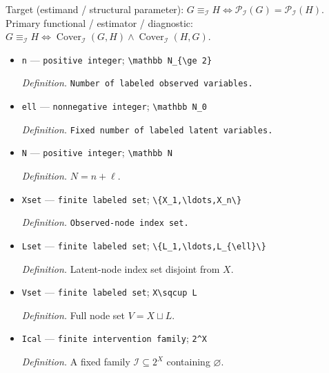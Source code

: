 \documentclass{article}
\begin{document}
Target (estimand / structural parameter): \(G\equiv_{\mathcal I}H\Longleftrightarrow\mathcal P_{\mathcal I}(G)=\mathcal P_{\mathcal I}(H)\).
Primary functional / estimator / diagnostic: \(G\equiv_{\mathcal I}H\Longleftrightarrow\operatorname{Cover}_{\mathcal I}(G,H)\wedge\operatorname{Cover}_{\mathcal I}(H,G)\).
\begin{itemize}
  \item \texttt{n} --- \texttt{positive integer}; \texttt{\textbackslash{}\allowbreak{}mathbb N\_\allowbreak{}\{\textbackslash{}\allowbreak{}ge 2\}\allowbreak{}}
  \par\smallskip\noindent\emph{Definition.} \texttt{Number of labeled observed variables.}
  \item \texttt{ell} --- \texttt{nonnegative integer}; \texttt{\textbackslash{}\allowbreak{}mathbb N\_\allowbreak{}0}
  \par\smallskip\noindent\emph{Definition.} \texttt{Fixed number of labeled latent variables.}
  \item \texttt{N} --- \texttt{positive integer}; \texttt{\textbackslash{}\allowbreak{}mathbb N}
  \par\smallskip\noindent\emph{Definition.} \(N=n+\ell\).
  \item \texttt{Xset} --- \texttt{finite labeled set}; \texttt{\textbackslash{}\allowbreak{}\{X\_\allowbreak{}1,\allowbreak{}\textbackslash{}\allowbreak{}ldots,\allowbreak{}X\_\allowbreak{}n\textbackslash{}\allowbreak{}\}\allowbreak{}}
  \par\smallskip\noindent\emph{Definition.} \texttt{Observed-\allowbreak{}node index set.}
  \item \texttt{Lset} --- \texttt{finite labeled set}; \texttt{\textbackslash{}\allowbreak{}\{L\_\allowbreak{}1,\allowbreak{}\textbackslash{}\allowbreak{}ldots,\allowbreak{}L\_\allowbreak{}\{\textbackslash{}\allowbreak{}ell\}\allowbreak{}\textbackslash{}\allowbreak{}\}\allowbreak{}}
  \par\smallskip\noindent\emph{Definition.} Latent-node index set disjoint from \(X\).
  \item \texttt{Vset} --- \texttt{finite labeled set}; \texttt{X\textbackslash{}\allowbreak{}sqcup L}
  \par\smallskip\noindent\emph{Definition.} Full node set \(V=X\sqcup L\).
  \item \texttt{Ical} --- \texttt{finite intervention family}; \texttt{2\textasciicircum{}X}
  \par\smallskip\noindent\emph{Definition.} A fixed family \(\mathcal I\subseteq 2^X\) containing \(\varnothing\).

\end{itemize}
\end{document}
